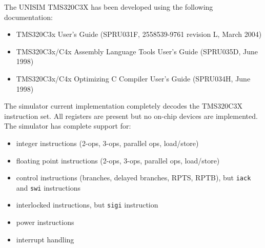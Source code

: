 The UNISIM TMS320C3X has been developed using the following documentation:
\begin{itemize}
\item TMS320C3x User’s Guide (SPRU031F, 2558539-9761 revision L, March 2004)
\item TMS320C3x/C4x Assembly Language Tools User’s Guide (SPRU035D, June 1998)
\item TMS320C3x/C4x Optimizing C Compiler User’s Guide (SPRU034H, June 1998)
\end{itemize}

The simulator current implementation completely decodes the TMS320C3X instruction set.
All registers are present but no on-chip devices are implemented.
The simulator has complete support for:
\begin{itemize}
\item integer instructions (2-ops, 3-ops, parallel ops, load/store)
\item floating point instructions (2-ops, 3-ops, parallel ops, load/store)
\item control instructions (branches, delayed branches, RPTS, RPTB), but \texttt{iack} and \texttt{swi} instructions
\item interlocked instructions, but \texttt{sigi} instruction
\item power instructions
\item interrupt handling
\end{itemize}

